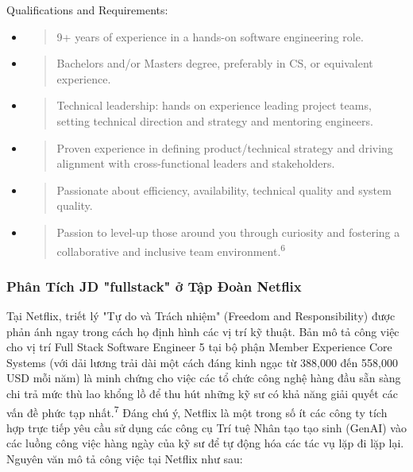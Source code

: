 \documentclass[12pt,a4paper]{article}
\begin{document}
Qualifications and Requirements:

\begin{itemize}
\item
  \begin{quote}
  9+ years of experience in a hands-on software engineering role.
  \end{quote}
\item
  \begin{quote}
  Bachelor\textquotesingle s and/or Master\textquotesingle s degree, preferably in CS, or equivalent experience.
  \end{quote}
\item
  \begin{quote}
  Technical leadership: hands on experience leading project teams, setting technical direction and strategy and mentoring engineers.
  \end{quote}
\item
  \begin{quote}
  Proven experience in defining product/technical strategy and driving alignment with cross-functional leaders and stakeholders.
  \end{quote}
\item
  \begin{quote}
  Passionate about efficiency, availability, technical quality and system quality.
  \end{quote}
\item
  \begin{quote}
  Passion to level-up those around you through curiosity and fostering a collaborative and inclusive team environment.\textsuperscript{6}
  \end{quote}
\end{itemize}

\subsubsection{Phân Tích JD "fullstack" ở Tập Đoàn Netflix}

Tại Netflix, triết lý "Tự do và Trách nhiệm" (Freedom and Responsibility) được phản ánh ngay trong cách họ định hình các vị trí kỹ thuật. Bản mô tả công việc cho vị trí Full Stack Software Engineer 5 tại bộ phận Member Experience Core Systems (với dải lương trải dài một cách đáng kinh ngạc từ 388,000 đến 558,000 USD mỗi năm) là minh chứng cho việc các tổ chức công nghệ hàng đầu sẵn sàng chi trả mức thù lao khổng lồ để thu hút những kỹ sư có khả năng giải quyết các vấn đề phức tạp nhất.\textsuperscript{7} Đáng chú ý, Netflix là một trong số ít các công ty tích hợp trực tiếp yêu cầu sử dụng các công cụ Trí tuệ Nhân tạo tạo sinh (GenAI) vào các luồng công việc hàng ngày của kỹ sư để tự động hóa các tác vụ lặp đi lặp lại. Nguyên văn mô tả công việc tại Netflix như sau:
\end{document}
